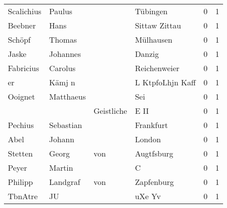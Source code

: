 \documentclass[10pt,a4paper,landscape]{article}
\begin{document}
\begin{longtable}{llllrr}
               Scalichius &                             Paulus &             &                                    Tübingen &          0 &         1 \\
                  Beebner &                               Hans &             &                               Sittaw Zittau &          0 &         1 \\
                   Schöpf &                             Thomas &             &                                   Mülhausen &          0 &         1 \\
                    Jaske &                           Johannes &             &                                      Danzig &          0 &         1 \\
                Fabricius &                            Carolus &             &                                Reichenweier &          0 &         1 \\
                       er &                             Kämj n &             &                            L KtpfoLhjn Kaff &          0 &         1 \\
                  Ooignet &                          Matthaeus &             &                                         Sei &          0 &         1 \\
                          &                                    &  Geistliche &                                        E II &          0 &         1 \\
                  Pechius &                          Sebastian &             &                                   Frankfurt &          0 &         1 \\
                     Abel &                             Johann &             &                                      London &          0 &         1 \\
                  Stetten &                              Georg &         von &                                  Augtfsburg &          0 &         1 \\
                    Peyer &                             Martin &             &                                           C &          0 &         1 \\
                  Philipp &                           Landgraf &         von &                                  Zapfenburg &          0 &         1 \\
                  TbnAtre &                                 JU &             &                                      uXe Yv &          0 &         1 \\

\end{longtable}
\end{document}
